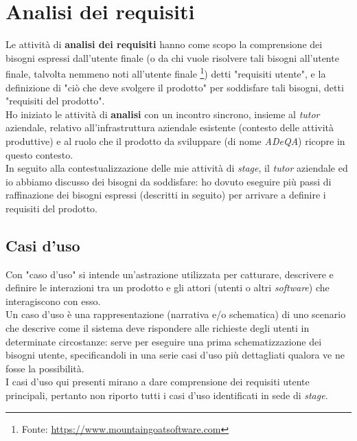 \section{Analisi dei requisiti}
\label{sec:analisi}
Le attività di \textbf{analisi dei requisiti} hanno come scopo la comprensione dei bisogni espressi dall'utente finale (o da chi vuole risolvere tali bisogni all'utente finale, talvolta nemmeno noti all'utente finale \footnote{Fonte: \href{https://www.mountaingoatsoftware.com/articles/i-didnt-know-i-needed-that}{https://www.mountaingoatsoftware.com}})
detti "requisiti utente", e la definizione di "ciò che deve svolgere il prodotto" per soddisfare tali bisogni, detti "requisiti del prodotto". \\
Ho iniziato le attività di \textbf{analisi} con un incontro sincrono, insieme al \textit{tutor} aziendale, relativo all'infrastruttura aziendale esistente (contesto delle attività produttive) e al ruolo che il prodotto da sviluppare (di nome \textit{ADeQA}) ricopre in questo contesto. \\
In seguito alla contestualizzazione delle mie attività di \textit{stage}, il \textit{tutor} aziendale ed io abbiamo discusso dei bisogni da soddisfare: ho dovuto eseguire più passi di raffinazione dei bisogni espressi (descritti in seguito) per arrivare a definire i requisiti del prodotto.

\subsection{Casi d'uso}
Con "caso d'uso" si intende un'astrazione utilizzata per catturare, descrivere e definire le interazioni tra un prodotto e gli attori (utenti o altri \textit{software}) che interagiscono con esso. \\
Un caso d'uso è una rappresentazione (narrativa e/o schematica) di uno scenario che descrive come il sistema deve rispondere alle richieste degli utenti in determinate circostanze: serve per eseguire una prima schematizzazione dei bisogni utente,
specificandoli in una serie casi d'uso più dettagliati qualora ve ne fosse la possibilità. \\
I casi d’uso qui presenti mirano a dare comprensione dei requisiti utente principali, pertanto non riporto tutti i casi d'uso identificati in sede di \textit{stage}.

